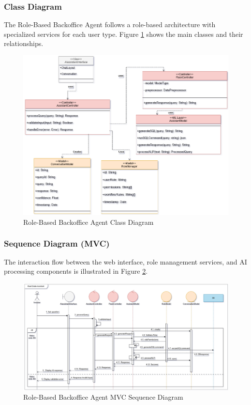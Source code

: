 \subsubsection{Class Diagram}
The Role-Based Backoffice Agent follows a role-based architecture with specialized services for each user type. Figure \ref{fig:backoffice-class-diagram} shows the main classes and their relationships.
\begin{figure}[htbp]
    \centering
    \includegraphics[width=1\textwidth]{images/backoffice_class_diagram.png}
    \caption{Role-Based Backoffice Agent Class Diagram}
    \label{fig:backoffice-class-diagram}
\end{figure}

\subsubsection{Sequence Diagram (MVC)}
The interaction flow between the web interface, role management services, and AI processing components is illustrated in Figure \ref{fig:backoffice-sequence-mvc}.
\newpage
\begin{figure}[htbp]
    \centering
    \includegraphics[width=1.1\textwidth]{images/backoffice_sequence_mvc.png}
    \caption{Role-Based Backoffice Agent MVC Sequence Diagram}
    \label{fig:backoffice-sequence-mvc}
\end{figure}

